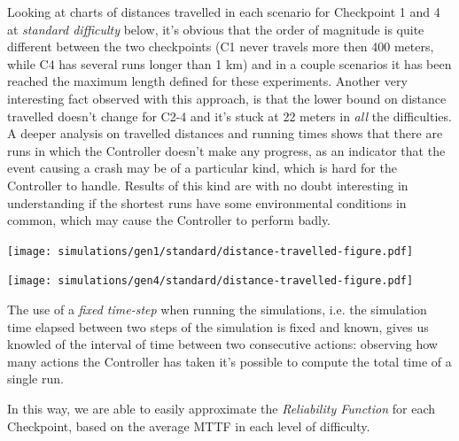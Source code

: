 Looking at charts of distances travelled in each scenario for Checkpoint 1 and 4 at \textsl{standard difficulty} below, it's obvious that the order of magnitude is quite different between the two checkpoints (C1 never travels more then 400 meters, while C4 has several runs longer than 1 km) and in a couple scenarios it has been reached the maximum length defined for these experiments.
Another very interesting fact observed with this approach, is that the lower bound on distance travelled doesn't change for C2-4 and it's stuck at 22 meters in \textsl{all} the difficulties. A deeper analysis on travelled distances and running times shows that there are runs in which the Controller doesn't make any progress, as an indicator that the event causing a crash may be of a particular kind, which is hard for the Controller to handle. Results of this kind are with no doubt interesting in understanding if the shortest runs have some environmental conditions in common, which may cause the Controller to perform badly.

\begin{minipage}[c]{\textwidth}
	\texttt{[image: simulations/gen1/standard/distance-travelled-figure.pdf]}

	\texttt{[image: simulations/gen4/standard/distance-travelled-figure.pdf]}
\end{minipage}

The use of a \textsl{fixed time-step} when running the simulations, i.e. the simulation time elapsed between two steps of the simulation is fixed and known, gives us knowled of the interval of time between two consecutive actions: observing how many actions the Controller has taken it's possible to compute the total time of a single run.

In this way, we are able to easily approximate the \textsl{Reliability Function} for each Checkpoint, based on the average MTTF in each level of difficulty.

